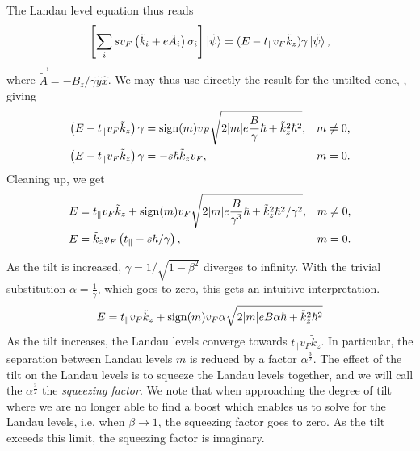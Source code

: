 The Landau level equation thus reads
\begin{equation}
  \label{eq:50}
  \left[
  \sum\limits_{i} s v_{F} \left(\tilde{k}_{i} + e \tilde{A}_{i} \right) \sigma _{i}
\right  ] \ket{\tilde{\psi}} =
(E- t_{\parallel} v_{F} \tilde{k}_{z}) \gamma \ket{\tilde{\psi}},
\end{equation}
where \(\vec{\tilde{A}}=-B_{z}/ \gamma  \tilde{y} \hat{x}\).
We may thus use directly the result for the untilted cone, , giving
\begin{align}
  \label{eq:51}
  \left(E - t_{\parallel} v_{F} \tilde{k}_{z} \right) \gamma &= \operatorname{sign} (m) v_{F} \sqrt{2 |m| e \frac{B}{ \gamma } \hbar + \tilde{k}_{z}^2 \hbar ^2}, & m \neq 0,\\
  \left(E - t_{\parallel} v_{F} \tilde{k}_{z} \right) \gamma &= - s \hbar  \tilde{k}_{z} v_{F}, & m=0.
\end{align}
Cleaning up, we get
\begin{align}
  \label{eq:52}
  E &= t_{\parallel} v_F \tilde{k}_{z} + \operatorname{sign}(m) v_F \sqrt{2 |m| e \frac{B}{\gamma ^3} \hbar + \tilde{k}_{z}^2\hbar ^2 /\gamma ^2}, & m\neq 0,\\
  E &= \tilde{k}_{z} v_{F} \left( t_{\parallel}  - s \hbar / \gamma  \right), & m=0.
\end{align}

As the tilt is increased, \(\gamma = 1 / \sqrt{1-\beta ^{2}}\) diverges to infinity.
With the trivial substitution \(\alpha = \frac{1}{\gamma }\), which goes to zero, this gets an intuitive interpretation.
\begin{equation}
  \label{eq:53}
  E = t_{\parallel} v_{F} \tilde{k}_{z} + \operatorname{sign}(m) v_F \alpha \sqrt{2 |m| e B \alpha \hbar + \tilde{k}_{z}^2\hbar ^2}
\end{equation}
As the tilt increases, the Landau levels converge towards \(t_{\parallel} v_{F} \tilde{k}_{z}\).
In particular, the separation between Landau levels \(m\)  is reduced by a factor \(\alpha ^{\frac{3}{2}}\).
The effect of the tilt on the Landau levels is to squeeze the Landau levels together, and we will call the \(\alpha ^{\frac{3}{2}}\) the \emph{squeezing factor}.
We note that when approaching the degree of tilt where we are no longer able to find a boost which enables us to solve for the Landau levels, i.e. when \(\beta \to 1\), the squeezing factor goes to zero.
As the tilt exceeds this limit, the squeezing factor is imaginary.

